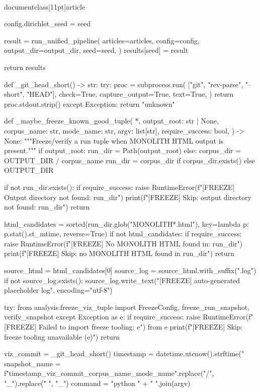 \\documentclass[11pt]{article}
\begin{document}
\begin{CodeBlock}
        config.dirichlet_seed = seed
        
        result = run_unified_pipeline(
            articles=articles,
            config=config,
            output_dir=output_dir,
            seed=seed,
        )
        results[seed] = result
    
    return results


def _git_head_short() -> str:
    try:
        proc = subprocess.run(
            ["git", "rev-parse", "--short", "HEAD"],
            check=True,
            capture_output=True,
            text=True,
        )
        return proc.stdout.strip()
    except Exception:
        return "unknown"


def _maybe_freeze_known_good_tuple(
    *,
    output_root: str | None,
    corpus_name: str,
    mode_name: str,
    argv: list[str],
    require_success: bool,
) -> None:
    """Freeze/verify a run tuple when MONOLITH HTML output is present."""
    if output_root:
        run_dir = Path(output_root)
    else:
        corpus_dir = OUTPUT_DIR / corpus_name
        run_dir = corpus_dir if corpus_dir.exists() else OUTPUT_DIR

    if not run_dir.exists():
        if require_success:
            raise RuntimeError(f"[FREEZE] Output directory not found: {run_dir}")
        print(f"[FREEZE] Skip: output directory not found: {run_dir}")
        return

    html_candidates = sorted(run_dir.glob("MONOLITH*.html"), key=lambda p: p.stat().st_mtime, reverse=True)
    if not html_candidates:
        if require_success:
            raise RuntimeError(f"[FREEZE] No MONOLITH HTML found in: {run_dir}")
        print(f"[FREEZE] Skip: no MONOLITH HTML found in {run_dir}")
        return

    source_html = html_candidates[0]
    source_log = source_html.with_suffix(".log")
    if not source_log.exists():
        source_log.write_text("[FREEZE] auto-generated placeholder log\n", encoding="utf-8")

    try:
        from analysis.freeze_viz_tuple import FreezeConfig, freeze_run_snapshot, verify_snapshot
    except Exception as e:
        if require_success:
            raise RuntimeError(f"[FREEZE] Failed to import freeze tooling: {e}") from e
        print(f"[FREEZE] Skip: freeze tooling unavailable ({e})")
        return

    viz_commit = _git_head_short()
    timestamp = datetime.utcnow().strftime("%
    snapshot_name = f"{timestamp}_{viz_commit}_{corpus_name}_{mode_name}".replace("/", "_").replace(" ", "_")
    command = "python " + " ".join(argv)


\end{CodeBlock}
\end{document}
